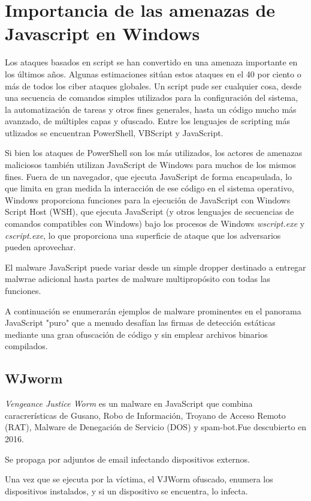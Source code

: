 \documentclass[15pt]{article}
\begin{document}
	\newpage
	\section{Importancia de las amenazas de Javascript en Windows}
	Los ataques basados en script se han convertido en una amenaza importante en los últimos años. Algunas estimaciones sitúan estos ataques en el 40 por ciento o más de todos los ciber ataques globales. Un script pude ser cualquier cosa, desde una secuencia de comandos simples utilizados para la configuración del sistema, la automatización de  tareas y otros fines generales, hasta un código mucho más avanzado, de múltiples capas y ofuscado. Entre los lenguajes de scripting más utlizados se encuentran PowerShell, VBScript y JavaScript.
	
	Si bien los ataques de PowerShell son los más utilizados, los actores de amenazas maliciosos también utilizan JavaScript de Windows para muchos de los mismos fines. Fuera de un navegador, que ejecuta JavaScript de forma encapsulada, lo que limita en gran medida la interacción de ese código en el sistema operativo, Windows proporciona funciones para la ejecución de JavaScript con Windows Script Host (WSH), que ejecuta JavaScript (y otros lenguajes de secuencias de comandos compatibles con Windows) bajo los procesos de Windows \textit{wscript.exe} y \textit{cscript.exe}, lo que proporciona una superficie de ataque que los adversarios pueden aprovechar.
	
	El malware JavaScript puede variar desde un simple dropper destinado a entregar malwrae adicional hasta partes de malware multipropósito con todas las funciones.
	
	A continuación se enumerarán ejemplos de malware prominentes en el panorama JavaScript "puro" que a menudo desafían las firmas de detección estáticas mediante una gran ofuscación de código y sin emplear archivos binarios compilados. \cite{javascript_malware}
	
	\subsection{WJworm}
	\textit{Vengeance Justice Worm} es un malware en JavaScript que combina caracrerísticas de Gusano, Robo de Información, Troyano de Acceso Remoto (RAT), Malware de Denegación de Servicio (DOS) y spam-bot.Fue descubierto en 2016.
	
	Se propaga por adjuntos de email infectando dispositivos externos.
	
	Una vez que se ejecuta por la víctima, el VJWorm ofuscado, enumera los dispositivos instalados, y si un dispositivo se encuentra, lo infecta.
	
\end{document}

